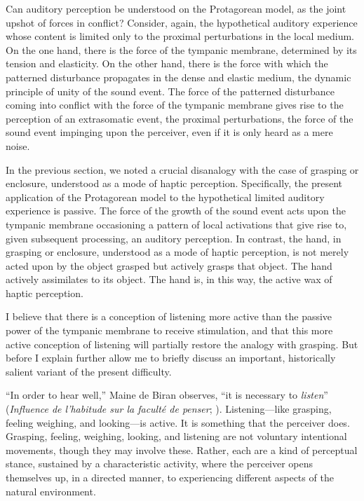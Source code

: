 Can auditory perception be understood on the Protagorean model, as the joint upshot of forces in conflict? Consider, again, the hypothetical auditory experience whose content is limited only to the proximal perturbations in the local medium. On the one hand, there is the force of the tympanic membrane, determined by its tension and elasticity. On the other hand, there is the force with which the patterned disturbance propagates in the dense and elastic medium, the dynamic principle of unity of the sound event. The force of the patterned disturbance coming into conflict with the force of the tympanic membrane gives rise to the perception of an extrasomatic event, the proximal perturbations, the force of the sound event impinging upon the perceiver, even if it is only heard as a mere noise.

In the previous section, we noted a crucial disanalogy with the case of grasping or enclosure, understood as a mode of haptic perception. Specifically, the present application of the Protagorean model to the hypothetical limited auditory experience is passive. The force of the growth of the sound event acts upon the tympanic membrane occasioning a pattern of local activations that give rise to, given subsequent processing, an auditory perception. In contrast, the hand, in grasping or enclosure, understood as a mode of haptic perception, is not merely acted upon by the object grasped but actively grasps that object. The hand actively assimilates to its object. The hand is, in this way, the active wax of haptic perception.

I believe that there is a conception of listening more active than the passive power of the tympanic membrane to receive stimulation, and that this more active conception of listening will partially restore the analogy with grasping. But before I explain further allow me to briefly discuss an important, historically salient variant of the present difficulty.

``In order to hear well,'' Maine de Biran observes, ``it is necessary to \emph{listen}'' (\emph{Influence de l'habitude sur la faculté de penser}; \citealt[63--4]{Boehm:1929aa}). Listening---like grasping, feeling weighing, and looking---is active. It is something that the perceiver does. Grasping, feeling, weighing, looking, and listening are not voluntary intentional movements, though they may involve these. Rather, each are a kind of perceptual stance, sustained by a characteristic activity, where the perceiver opens themselves up, in a directed manner, to experiencing different aspects of the natural environment.

